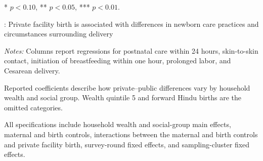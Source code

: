 \documentclass[12pt]{article}
\begin{document}
\begin{landscape}
\begin{table}[H]
\begin{threeparttable}
\begin{minipage}{0.92\textwidth}
            * $p<0.10$, ** $p<0.05$, *** $p<0.01$.
        \end{minipage}

    \end{threeparttable}

\end{table}

\setlength{\tabcolsep}{6pt}
\renewcommand{\arraystretch}{1}

\end{landscape}


\clearpage



\begin{landscape}

\renewcommand{\arraystretch}{0.9}
\setlength{\tabcolsep}{10pt}

\begin{table}[H]
    \centering

    \caption{
        : Private facility birth is associated with differences in newborn
        care practices and circumstances surrounding delivery
    }
    \label{tab:newborn_care}

    \vspace{0.4em}

    \begin{threeparttable}

        \begin{adjustbox}{max width=\textwidth}
            \scriptsize
            
        \end{adjustbox}

        \vspace{0.5em}

        \begin{minipage}{0.92\textwidth}
            \scriptsize
            \textit{Notes:}
            Columns report regressions for postnatal care within 24 hours,
            skin-to-skin contact, initiation of breastfeeding within one
            hour, prolonged labor, and Cesarean delivery.

            Reported coefficients describe how private--public differences
            vary by household wealth and social group. Wealth quintile 5 and
            forward Hindu births are the omitted categories.

            All specifications include household wealth and social-group main
            effects, maternal and birth controls, interactions between the
            maternal and birth controls and private facility birth,
            survey-round fixed effects, and sampling-cluster fixed effects.


\end{minipage}
\end{threeparttable}
\end{table}
\end{landscape}
\end{document}
